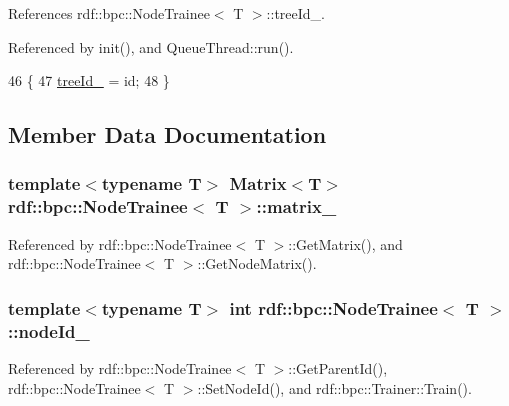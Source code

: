 References rdf\+::bpc\+::\+Node\+Trainee$<$ T $>$\+::tree\+Id\+\_\+.



Referenced by init(), and Queue\+Thread\+::run().


\begin{DoxyCode}
46                                    \{
47         \hyperlink{classrdf_1_1bpc_1_1NodeTrainee_a04ec4bdb96ed7d47ab99e6a4f65294f3}{treeId\_} = id;
48       \}
\end{DoxyCode}


\subsection{Member Data Documentation}
\subsubsection[{\texorpdfstring{matrix\+\_\+}{matrix_}}]{\setlength{\rightskip}{0pt plus 5cm}template$<$typename T$>$ {\bf Matrix}$<$T$>$ {\bf rdf\+::bpc\+::\+Node\+Trainee}$<$ T $>$\+::matrix\+\_\+\hspace{0.3cm}{\ttfamily [private]}}\hypertarget{classrdf_1_1bpc_1_1NodeTrainee_af5b2daa1f044078d5086200e43ae9b0f}{}\label{classrdf_1_1bpc_1_1NodeTrainee_af5b2daa1f044078d5086200e43ae9b0f}


Referenced by rdf\+::bpc\+::\+Node\+Trainee$<$ T $>$\+::\+Get\+Matrix(), and rdf\+::bpc\+::\+Node\+Trainee$<$ T $>$\+::\+Get\+Node\+Matrix().

\subsubsection[{\texorpdfstring{node\+Id\+\_\+}{nodeId_}}]{\setlength{\rightskip}{0pt plus 5cm}template$<$typename T$>$ int {\bf rdf\+::bpc\+::\+Node\+Trainee}$<$ T $>$\+::node\+Id\+\_\+}\hypertarget{classrdf_1_1bpc_1_1NodeTrainee_a208e3eafbece621b9618f6e3ddd27947}{}\label{classrdf_1_1bpc_1_1NodeTrainee_a208e3eafbece621b9618f6e3ddd27947}


Referenced by rdf\+::bpc\+::\+Node\+Trainee$<$ T $>$\+::\+Get\+Parent\+Id(), rdf\+::bpc\+::\+Node\+Trainee$<$ T $>$\+::\+Set\+Node\+Id(), and rdf\+::bpc\+::\+Trainer\+::\+Train().

